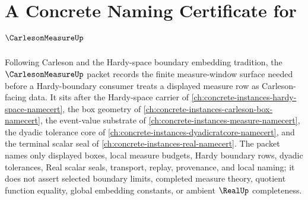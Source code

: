 \chapter{A Concrete Naming Certificate for $\CarlesonMeasureUp$}
\label{ch:concrete-instances-carleson-measure-namecert}

Following Carleson and the Hardy-space boundary embedding tradition, the $\CarlesonMeasureUp$ packet records the finite measure-window surface needed before a Hardy-boundary consumer treats a displayed measure row as Carleson-facing data. It sits after the Hardy-space carrier of \autoref{ch:concrete-instances-hardy-space-namecert}, the box geometry of \autoref{ch:concrete-instances-carleson-box-namecert}, the event-value substrate of \autoref{ch:concrete-instances-measure-namecert}, the dyadic tolerance core of \autoref{ch:concrete-instances-dyadicratcore-namecert}, and the terminal scalar seal of \autoref{ch:concrete-instances-real-namecert}. The packet names only displayed boxes, local measure budgets, Hardy boundary rows, dyadic tolerances, Real scalar seals, transport, replay, provenance, and local naming; it does not assert selected boundary limits, completed measure theory, quotient function equality, global embedding constants, or ambient $\RealUp$ completeness.

